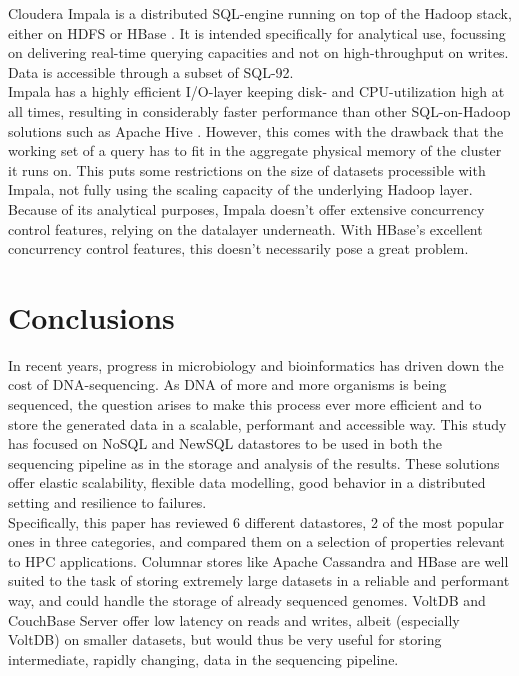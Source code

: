 \documentclass{IEEEtran}
\begin{document}
Cloudera Impala is a distributed SQL-engine running on top of the Hadoop stack, either on HDFS or HBase \cite{cloudera_impala}. It is intended specifically for analytical use, focussing on delivering real-time querying capacities and not on high-throughput on writes.
\\Data is accessible through a subset of SQL-92.
\\Impala has a highly efficient I/O-layer keeping disk- and CPU-utilization high at all times, resulting in considerably faster performance than other SQL-on-Hadoop solutions such as Apache Hive \cite{floratou2014sql}. However, this comes with the drawback that the working set of a query has to fit in the aggregate physical memory of the cluster it runs on. This puts some restrictions on the size of datasets processible with Impala, not fully using the scaling capacity of the underlying Hadoop layer.
\\Because of its analytical purposes, Impala doesn't offer extensive concurrency control features, relying on the datalayer underneath. With HBase's excellent concurrency control features, this doesn't necessarily pose a great problem.
 
\section{Conclusions}

In recent years, progress in microbiology and bioinformatics has driven down the cost of DNA-sequencing. As DNA of more and more organisms is being sequenced, the question arises to make this process ever more efficient and to store the generated data in a scalable, performant and accessible way. This study has focused on NoSQL and NewSQL datastores to be used in both the sequencing pipeline as in the storage and analysis of the results. These solutions offer elastic scalability, flexible data modelling, good behavior in a distributed setting and resilience to failures.\\
Specifically, this paper has reviewed 6 different datastores, 2 of the most popular ones in three categories, and compared them on a selection of properties relevant to HPC applications. Columnar stores like Apache Cassandra and HBase are well suited to the task of storing extremely large datasets in a reliable and performant way, and could handle the storage of already sequenced genomes. VoltDB and CouchBase Server offer low latency on reads and writes, albeit (especially VoltDB) on smaller datasets, but would thus be very useful for storing intermediate, rapidly changing, data in the sequencing pipeline. %

{}

\end{document}
